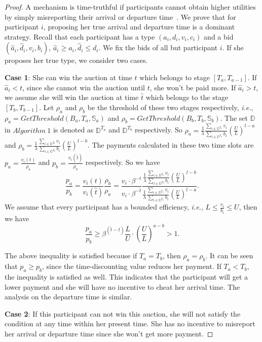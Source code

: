 \documentclass[10pt,journal,letterpaper,compsoc]{IEEEtran}
\newcommand{\ie}{{\em i.e.}}
\begin{document}
\begin{proof}
A mechanism is time-truthful if participants cannot
obtain higher utilities by simply misreporting their arrival or departure time~\cite{zhao2014crowdsource}. We prove that for participant $i$, proposing her true arrival and departure time is a dominant strategy. Recall that each participant has a type $(a_i,d_i,v_i,c_i)$ and a bid $(\hat{a}_i,\hat{d}_i, v_i,b_i)$, $\hat{a}_i\ge a_i, \hat{d}_i\le d_i$. We fix the bids of all but participant $i$. If she proposes her true type, we consider two cases.

\textbf{Case 1}: She can win the auction  at time $t$ which belongs to  stage $[T_a,T_{a-1}]$. If $\hat{a}_i<t$, since she cannot win the auction until $t$, she won't be paid more. If $\hat{a}_i>t$, we assume she will win the auction at time $\hat{t}$ which belongs to the stage $[T_b,T_{b-1}]$. Let $\rho_a$ and $\rho_b$ be the threshold of these two stages respectively, \ie, $\rho_a=GetThreshold(B_a,T_a,\mathbb{S}_a)$ and $\rho_b=GetThreshold(B_b,T_b,\mathbb{S}_b)$. The set $\mathbb{D}$ in $Algorithm\ 1$ is denoted as $\mathbb{D}^{T_a}$ and $\mathbb{D}^{T_b}$ respectively. So $\rho_a =\frac{1}{\lambda}\frac{\sum_{i\in\mathbb{D}^{T_a}}v_i}{\sum_{i\in\mathbb{D}^{T_a}}b_i}\left(\frac{U}{L}\right)^{l-a}$ and $\rho_b =\frac{1}{\lambda}\frac{\sum_{i\in\mathbb{D}^{T_b}}v_i}{\sum_{i\in\mathbb{D}^{T_b}}b_i}\left(\frac{U}{L}\right)^{l-b}$. The payments calculated in these two time slots are $p_a=\frac{v_i(t)}{\rho_a}$ and $p_b=\frac{v_i(\hat{t})}{\rho_b}$ respectively. So we have
\begin{equation}
\frac{p_a}{p_b}=\frac{v_i(t)}{v_i(\hat{t})}\frac{\rho_b}{\rho_a}=\frac{v_i \cdot \beta^{-t}}{v_i \cdot \beta^{-\hat{t}}}\frac{\frac{1}{\lambda}\frac{\sum_{i\in\mathbb{D}^{T_b}}v_i}{\sum_{i\in\mathbb{D}^{T_b}}b_i}\left(\frac{U}{L}\right)^{l-b}}{\frac{1}{\lambda}\frac{\sum_{i\in\mathbb{D}^{T_a}}v_i}{\sum_{i\in\mathbb{D}^{T_a}}b_i}\left(\frac{U}{L}\right)^{l-a}}.
\end{equation}
We assume that every participant has a bounded efficiency, \ie, $L \le \frac{v_i}{b_i} \le U$, then we have
\begin{equation}
\frac{p_a}{p_b} \ge \beta^{(\hat{t}-t)} \frac{L}{U}  \cdot \left(\frac{U}{L}\right)^{a-b} > 1.
\end{equation}

The above inequality is satisfied because if $T_a=T_b$, then $\rho_a=\rho_b$. It can be seen that $p_a \ge p_b$, since the time-discounting value reduces her payment. If $T_a < T_b$, the inequality is satisfied as well. This indicates that the participant will get a lower payment and she will have no incentive to cheat her arrival time. The analysis on the departure time is similar.

\textbf{Case 2}: If this participant can not win this auction, she will not satisfy the condition at any time within her present time. She has no incentive to misreport her arrival or departure time since she won't get more payment.
\end{proof}
\end{document}
